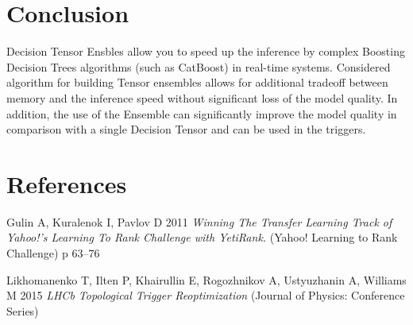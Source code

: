 \documentclass[a4paper]{jpconf}
\begin{document}
\section{Conclusion}

Decision Tensor Ensbles allow you to speed up the inference by complex Boosting Decision Trees algorithms (such as CatBoost) in real-time systems. Considered algorithm for building Tensor ensembles allows for additional tradeoff between memory and the inference speed without significant loss of the model quality.
In addition, the use of the Ensemble can significantly improve the model quality in comparison with a single Decision Tensor and can be used in the triggers.


\section*{References}
\item Gulin A, Kuralenok I, Pavlov D 2011 {\it Winning The Transfer Learning Track of Yahoo!'s Learning To Rank Challenge with YetiRank.} (Yahoo! Learning to Rank Challenge) p 63--76
\item Likhomanenko T, Ilten P, Khairullin E, Rogozhnikov A, Ustyuzhanin A, Williams M 2015 {\it LHCb Topological Trigger Reoptimization} (Journal of Physics: Conference Series)
\endnumrefs
\end{document}
